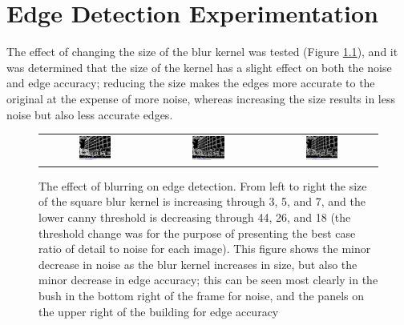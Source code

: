 \chapter{Edge Detection Experimentation}

The effect of changing the size of the blur kernel was tested (Figure \ref{fig:Blur}), and it was determined that the size of the kernel has a slight effect on both the noise and edge accuracy; reducing the size makes the edges more accurate to the original at the expense of more noise, whereas increasing the size results in less noise but also less accurate edges.

\begin{figure}[H]
    \begin{center}
    \begin{tabular}{ c c c }
        \includegraphics[width=0.31\textwidth]{Figures/Blur1.png} &
        \includegraphics[width=0.31\textwidth]{Figures/Blur2.png} &
        \includegraphics[width=0.31\textwidth]{Figures/Blur3.png}
    \end{tabular}
    \caption[The effect of blurring on edge detection]{The effect of blurring on edge detection. From left to right the size of the square blur kernel is increasing through 3, 5, and 7, and the lower canny threshold is decreasing through 44, 26, and 18 (the threshold change was for the purpose of presenting the best case ratio of detail to noise for each image). This figure shows the minor decrease in noise as the blur kernel increases in size, but also the minor decrease in edge accuracy; this can be seen most clearly in the bush in the bottom right of the frame for noise, and the panels on the upper right of the building for edge accuracy}
    \label{fig:Blur}
    \end{center}
\end{figure}

